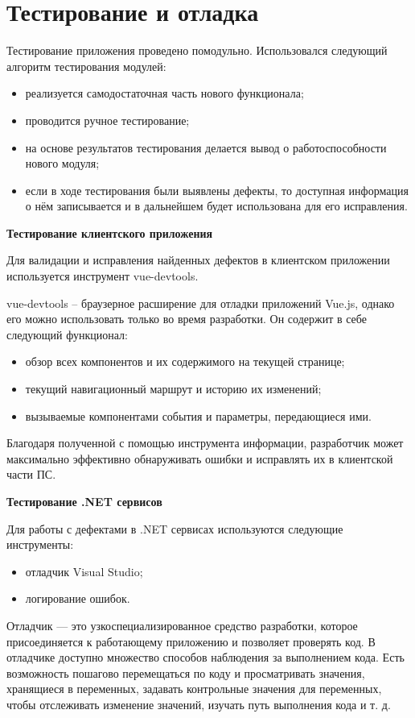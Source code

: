 \section{Тестирование и отладка}\label{sec:manual}

Тестирование приложения проведено помодульно. Использовался следующий алгоритм тестирования модулей:
\begin{itemize}
    \item реализуется самодостаточная часть нового функционала;
    \item проводится ручное тестирование;
    \item на основе результатов тестирования делается вывод о работоспособности нового модуля;
    \item если в ходе тестирования были выявлены дефекты, то доступная информация о нём записывается и в дальнейшем будет использована для его исправления.
\end{itemize}

\bigskip
\textbf{Тестирование клиентского приложения}

Для валидации и исправления найденных дефектов в клиентском приложении используется инструмент vue-devtools.

vue-devtools – браузерное расширение для отладки приложений Vue.js, однако его можно использовать только во время разработки. Он содержит в себе следующий функционал:
\begin{itemize}
    \item обзор всех компонентов и их содержимого на текущей странице;
    \item текущий навигационный маршрут и историю их изменений;
    \item вызываемые компонентами события и параметры, передающиеся ими.
\end{itemize}

Благодаря полученной с помощью инструмента информации, разработчик может максимально эффективно обнаруживать ошибки и исправлять их в клиентской части ПС.

\bigskip
\textbf{Тестирование .NET сервисов}

Для работы с дефектами в .NET сервисах используются следующие инструменты:
\begin{itemize}
    \item отладчик Visual Studio;
    \item логирование ошибок.
\end{itemize}

Отладчик — это узкоспециализированное средство разработки, которое присоединяется к работающему приложению и позволяет проверять код. В отладчике доступно множество способов наблюдения за выполнением кода. Есть возможность пошагово перемещаться по коду и просматривать значения, хранящиеся в переменных, задавать контрольные значения для переменных, чтобы отслеживать изменение значений, изучать путь выполнения кода и т. д.

